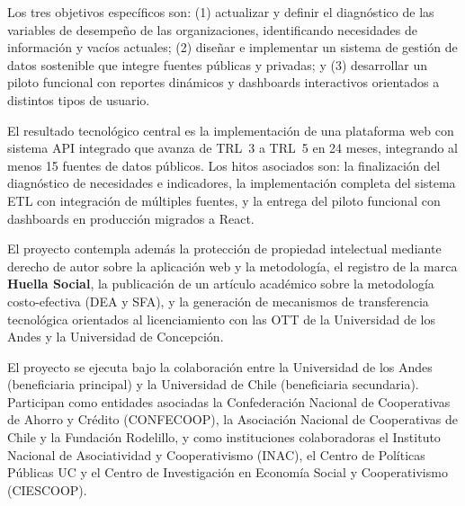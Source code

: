 Los tres objetivos específicos son: (1) actualizar y definir el diagnóstico de las variables de
desempeño de las organizaciones, identificando necesidades de información y vacíos actuales;
(2) diseñar e implementar un sistema de gestión de datos sostenible que integre fuentes públicas
y privadas; y (3) desarrollar un piloto funcional con reportes dinámicos y dashboards interactivos
orientados a distintos tipos de usuario.
 
El resultado tecnológico central es la implementación de una plataforma web con sistema API
integrado que avanza de TRL~3 a TRL~5 en 24 meses, integrando al menos 15 fuentes de datos
públicos. Los hitos asociados son: la finalización del diagnóstico de necesidades e indicadores,
la implementación completa del sistema ETL con integración de múltiples fuentes, y la entrega del
piloto funcional con dashboards en producción migrados a React.
 
El proyecto contempla además la protección de propiedad intelectual mediante derecho de autor
sobre la aplicación web y la metodología, el registro de la marca \textbf{Huella Social}, la
publicación de un artículo académico sobre la metodología costo-efectiva (DEA y SFA), y la
generación de mecanismos de transferencia tecnológica orientados al licenciamiento con las OTT
de la Universidad de los Andes y la Universidad de Concepción.
 
El proyecto se ejecuta bajo la colaboración entre la Universidad de los Andes
(beneficiaria principal) y la Universidad de Chile (beneficiaria secundaria).
Participan como entidades asociadas la Confederación Nacional de Cooperativas
de Ahorro y Crédito (CONFECOOP), la Asociación Nacional de Cooperativas de
Chile y la Fundación Rodelillo, y como instituciones colaboradoras el
Instituto Nacional de Asociatividad y Cooperativismo (INAC), el Centro de
Políticas Públicas UC y el Centro de Investigación en Economía Social y
Cooperativismo (CIESCOOP).


